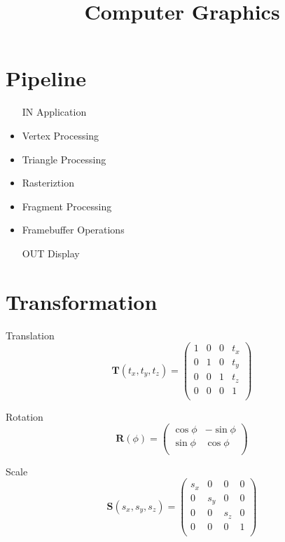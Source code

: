 \documentclass[10pt,a4paper]{article}
\begin{document}
    \title{Computer Graphics}
    \date{}

    \begin{multicols}{3}
        \maketitle


		\section{Pipeline}

		\begin{itemize}
			\item[IN] Application
			\item Vertex Processing
			\item Triangle Processing
			\item Rasteriztion
			\item Fragment Processing
			\item Framebuffer Operations
			\item[OUT] Display
		\end{itemize}

		\section{Transformation}

		Translation
		\begin{equation*}
			\mathbf{T}(t_x,t_y,t_z) = \begin{pmatrix}
				1 & 0 & 0 & t_x \\
				0 & 1 & 0 & t_y \\
				0 & 0 & 1 & t_z \\
				0 & 0 & 0 & 1 \\
			\end{pmatrix}
		\end{equation*}

		Rotation
		\begin{equation*}
			\mathbf{R}(\phi) = \begin{pmatrix}
				\cos\phi & -\sin\phi \\
				\sin\phi & \cos\phi \\
			\end{pmatrix}
		\end{equation*}

		Scale
		\begin{equation*}
			\mathbf{S}(s_x,s_y,s_z) = \begin{pmatrix}
				s_x & 0 & 0 & 0 \\
				0 & s_y & 0 & 0 \\
				0 & 0 & s_z & 0 \\
				0 & 0 & 0 & 1 \\
			\end{pmatrix}
		\end{equation*}


\end{multicols}
\end{document}
